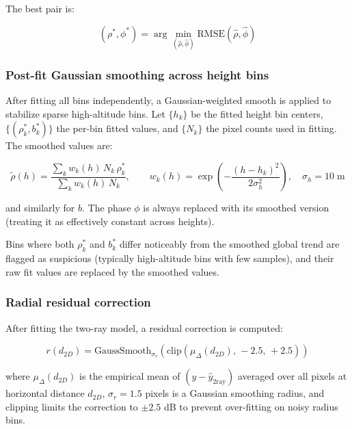 \documentclass[11pt,a4paper]{article}
\begin{document}
The best pair is:

\begin{equation}
(\rho^*, \phi^*)
= \arg\min_{(\hat\rho, \hat\phi)}
\mathrm{RMSE}(\hat\rho, \hat\phi)
\end{equation}

\subsubsection{Post-fit Gaussian smoothing across height bins}

After fitting all bins independently, a Gaussian-weighted smooth is applied
to stabilize sparse high-altitude bins. Let $\{h_k\}$ be the fitted height
bin centers, $\{(\rho_k^*, b_k^*)\}$ the per-bin fitted values, and $\{N_k\}$
the pixel counts used in fitting. The smoothed values are:

\begin{equation}
\tilde\rho(h)
=
\frac{\sum_k w_k(h)\,N_k\,\rho_k^*}{\sum_k w_k(h)\,N_k},
\qquad
w_k(h) = \exp\!\left(-\frac{(h - h_k)^2}{2\sigma_h^2}\right),
\quad \sigma_h = 10\;\mathrm{m}
\label{eq:gauss_smooth}
\end{equation}

and similarly for $b$. The phase $\phi$ is always replaced with its smoothed
version (treating it as effectively constant across heights).

Bins where both $\rho_k^*$ and $b_k^*$ differ noticeably from the smoothed
global trend are flagged as suspicious (typically high-altitude bins with few
samples), and their raw fit values are replaced by the smoothed values.

\subsubsection{Radial residual correction}

After fitting the two-ray model, a residual correction is computed:

\begin{equation}
r(d_{2D}) =
\mathrm{GaussSmooth}_{\sigma_r}\left(
\mathrm{clip}\left(
\mu_{\Delta}(d_{2D}),\, -2.5,\, +2.5
\right)
\right)
\end{equation}

where $\mu_{\Delta}(d_{2D})$ is the empirical mean of $(y - \hat y_{\mathrm{2ray}})$
averaged over all pixels at horizontal distance $d_{2D}$, $\sigma_r = 1.5$
pixels is a Gaussian smoothing radius, and clipping limits the correction to
$\pm 2.5$ dB to prevent over-fitting on noisy radius bins.
\end{document}
